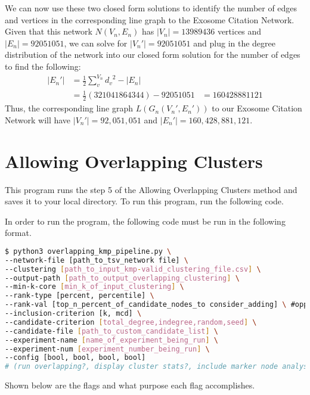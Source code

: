 \documentclass[12pt, oneside]{article}   	%
\begin{document}
We can now use these two closed form solutions to identify the number of edges and vertices in the corresponding line graph to the Exosome Citation Network. Given that this network $N(V_n, E_n)$ has $|V_n| = 13989436$ vertices and $|E_n| = 92051051$, we can solve for $|V_n'| = 92051051$ and plug in the degree distribution of the network into our closed form solution for the number of edges to find the following:
\begin{equation}
    \begin{aligned}
    |E_n'| &= \frac{1}{2}\sum^{V_n}_{v} {d_v}^2 - |E_n|\\
    &= \frac{1}{2}(321041864344) - 92051051
    &= 160428881121
    \end{aligned}
\end{equation}
Thus, the corresponding line graph $L(G_n(V_n', E_n'))$ to our Exosome Citation Network will have $|V_n'| = 92,051,051$ and $|E_n'| = 160,428,881,121$. 

\section{Allowing Overlapping Clusters} 

This program runs the step 5 of the Allowing Overlapping Clusters method and saves it to your local directory. To run this program, run the following code.

In order to run the  program, the following code must be run in the following format. 
\begin{lstlisting}[language=bash]
$ python3 overlapping_kmp_pipeline.py \
--network-file [path_to_tsv_network file] \
--clustering [path_to_input_kmp-valid_clustering_file.csv] \
--output-path [path_to_output_overlapping_clustering] \
--min-k-core [min_k_of_input_clustering] \
--rank-type [percent, percentile] \
--rank-val [top_n_percent_of_candidate_nodes_to consider_adding] \ #opposite if percentile 
--inclusion-criterion [k, mcd] \
--candidate-criterion [total_degree,indegree,random,seed] \
--candidate-file [path_to_custom_candidate_list] \
--experiment-name [name_of_experiment_being_run] \ 
--experiment-num [experiment_number_being_run] \ 
--config [bool, bool, bool, bool] 
# (run overlapping?, display cluster stats?, include marker node analysis?, save outputs?)
\end{lstlisting}

Shown below are the flags and what purpose each flag accomplishes. 
\end{document}
